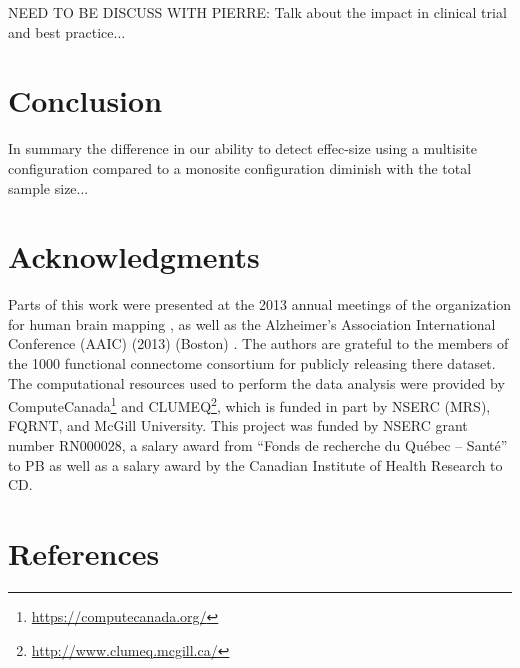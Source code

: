 \documentclass[authoryear]{elsarticle}
\begin{document}
NEED TO BE DISCUSS WITH PIERRE: Talk about the impact in clinical trial and best practice...\\



\section{Conclusion}
In summary the difference in our ability to detect effec-size using a multisite configuration compared to a monosite configuration diminish with the total sample size...


\section{Acknowledgments}
Parts of this work were presented at the 2013 annual meetings of the organization for human brain mapping \citep{Dansereau2013a}, as well as the  Alzheimer's Association International Conference (AAIC) (2013) (Boston) \citep{Dansereau2013b}. The authors are grateful to the members of the 1000 functional connectome consortium for publicly releasing there dataset. The computational resources used to perform the data analysis were provided by ComputeCanada\footnote{\url{https://computecanada.org/}} and CLUMEQ\footnote{\url{http://www.clumeq.mcgill.ca/}}, which is funded in part by NSERC (MRS), FQRNT, and McGill University. This project was funded by NSERC grant number RN000028, a salary award from ``Fonds de recherche du Qu\'ebec -- Sant\'e'' to PB as well as a salary award by the Canadian Institute of Health Research to CD.

\section*{References}





\pagebreak



\clearpage
\appendix
\end{document}
